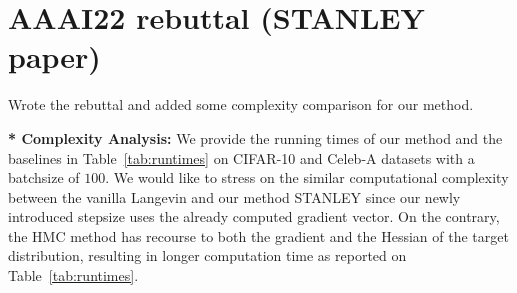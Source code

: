 \documentclass{article}
\begin{document}
\section{ AAAI22 rebuttal (STANLEY paper)}
Wrote the rebuttal and added some complexity comparison for our method.

\noindent \textbf{* Complexity Analysis:} We provide the running times of our method and the baselines in Table~\ref{tab:runtimes} on CIFAR-10 and Celeb-A datasets with a batchsize of $100$.
We would like to stress on the similar computational complexity between the vanilla Langevin and our method STANLEY since our newly introduced stepsize uses the already computed gradient vector. 
On the contrary, the HMC method has recourse to both the gradient and the Hessian of the target distribution, resulting in longer computation time as reported on Table~\ref{tab:runtimes}.

\begin{table}[h]
\small
\caption{ Runtime (in s) for training our EBM during 1 epoch.}\label{tab:runtimes}
	\vspace{-0.1in}
\end{table}




\end{document}
